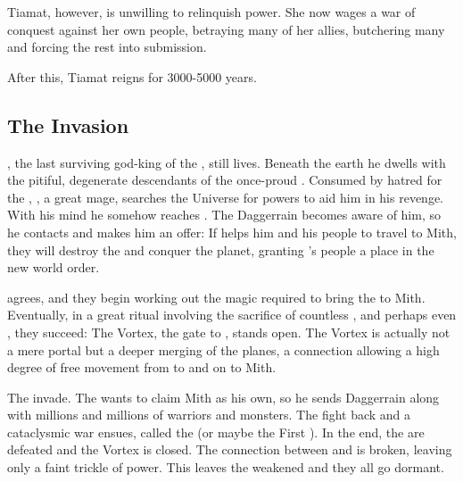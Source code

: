 Tiamat, however, is unwilling to relinquish power. She now wages a war of conquest against her own people, betraying many of her allies, butchering many and forcing the rest into submission. 

After this, Tiamat reigns for 3000-5000 years. 



\subsection{The \Bane{} Invasion}
\Semiza, the last surviving god-king of the \nephilim{}, still lives. Beneath the earth he dwells with the pitiful, degenerate descendants of the once-proud \nephilim. Consumed by hatred for the \dragons{}, \Semiza, a great mage, searches the Universe for powers to aid him in his revenge. With his mind he somehow reaches \Erebos{}. The \banelord{} Daggerrain becomes aware of him, so he contacts \Semiza{} and makes him an offer: If \Semiza{} helps him and his people to travel to Mith, they will destroy the \dragons{} and conquer the planet, granting \Semiza's people a place in the new world order. 

\Semiza{} agrees, and they begin working out the magic required to bring the \banes{} to Mith. Eventually, in a great ritual involving the sacrifice of countless \nephilim, \scathae{} and perhaps even \dragons{}, they succeed: The Vortex, the gate to \Erebos{}, stands open. The Vortex is actually not a mere portal but a deeper merging of the planes, a connection allowing a high degree of free movement from \Erebos{} to \Nyx{} and on to Mith. 

The \banes{} invade. The \baneking{} \Voidbringer{} wants to claim Mith as his own, so he sends Daggerrain along with millions and millions of \bane{} warriors and monsters. 
The \dragons{} fight back and a cataclysmic war ensues, called the \Banewar{} (or maybe the First \Banewar). In the end, the \banes{} are defeated and the Vortex is closed. 
The connection between \Nyx{} and \Erebos{} is broken, leaving only a faint trickle of power. This leaves the \Dominators{} weakened and they all go dormant. 



